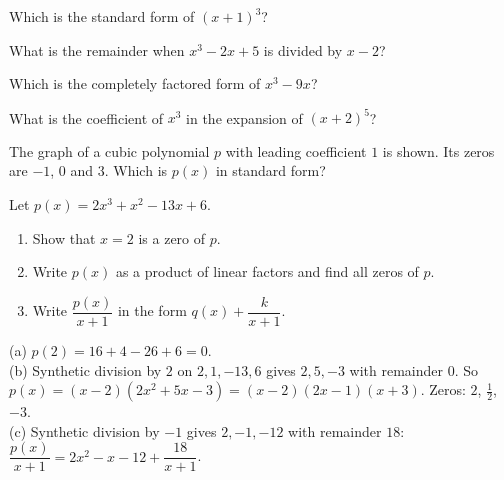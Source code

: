 \begin{exo}{}
Which is the standard form of $(x+1)^3$?
\end{exo}
\begin{exo}{}
What is the remainder when $x^3-2x+5$ is divided by $x-2$?
\end{exo}
\begin{exo}{}
Which is the completely factored form of $x^3-9x$?
\end{exo}
\begin{exo}{}
What is the coefficient of $x^3$ in the expansion of $(x+2)^5$?
\end{exo}
\begin{exo}[graph]{}
\begin{minipage}{\linewidth}
The graph of a cubic polynomial $p$ with leading coefficient $1$ is shown. Its zeros are $-1$, $0$ and $3$. Which is $p(x)$ in standard form?
\begin{center}\end{center}
\end{minipage}
\end{exo}
\begin{exo}{}
Let $p(x)=2x^3+x^2-13x+6$.
\begin{enumerate}[label=(\alph*)]
\item Show that $x=2$ is a zero of $p$.
\item Write $p(x)$ as a product of linear factors and find all zeros of $p$.
\item Write $\dfrac{p(x)}{x+1}$ in the form $q(x)+\dfrac{k}{x+1}$.
\end{enumerate}
\begin{solution}
(a) $p(2)=16+4-26+6=0$.\\
(b) Synthetic division by $2$ on $2,1,-13,6$ gives $2,5,-3$ with remainder $0$. So $p(x)=(x-2)(2x^2+5x-3)=(x-2)(2x-1)(x+3)$. Zeros: $2$, $\frac12$, $-3$.\\
(c) Synthetic division by $-1$ gives $2,-1,-12$ with remainder $18$: $\dfrac{p(x)}{x+1}=2x^2-x-12+\dfrac{18}{x+1}$.
\end{solution}
\end{exo}

